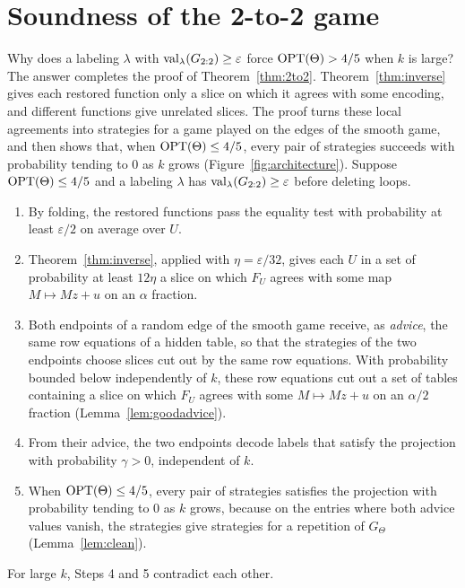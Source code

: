 \chapter{Soundness of the 2-to-2 game}\label{ch:twotwo}

Why does a labeling $\lambda$ with $\operatorname{val}_\lambda(G_{2:2})\ge\varepsilon$ force $\operatorname{OPT}(\Theta)>4/5$ when $k$ is large? The answer completes the proof of Theorem~\ref{thm:2to2}. Theorem~\ref{thm:inverse} gives each restored function only a slice on which it agrees with some encoding, and different functions give unrelated slices. The proof turns these local agreements into strategies for a game played on the edges of the smooth game, and then shows that, when $\operatorname{OPT}(\Theta)\le4/5$, every pair of strategies succeeds with probability tending to $0$ as $k$ grows (Figure~\ref{fig:architecture}). Suppose $\operatorname{OPT}(\Theta)\le4/5$ and a labeling $\lambda$ has $\operatorname{val}_\lambda(G_{2:2})\ge\varepsilon$ before deleting loops.
\begin{enumerate}
\item By folding, the restored functions pass the equality test with probability at least $\varepsilon/2$ on average over $U$.
\item Theorem~\ref{thm:inverse}, applied with $\eta=\varepsilon/32$, gives each $U$ in a set of probability at least $12\eta$ a slice on which $F_U$ agrees with some map $M\mapsto Mz+u$ on an $\alpha$ fraction.
\item Both endpoints of a random edge of the smooth game receive, as \emph{advice}, the same row equations of a hidden table, so that the strategies of the two endpoints choose slices cut out by the same row equations. With probability bounded below independently of $k$, these row equations cut out a set of tables containing a slice on which $F_U$ agrees with some $M\mapsto Mz+u$ on an $\alpha/2$ fraction (Lemma~\ref{lem:goodadvice}).
\item From their advice, the two endpoints decode labels that satisfy the projection with probability $\gamma>0$, independent of $k$.
\item When $\operatorname{OPT}(\Theta)\le4/5$, every pair of strategies satisfies the projection with probability tending to $0$ as $k$ grows, because on the entries where both advice values vanish, the strategies give strategies for a repetition of $G_\Theta$ (Lemma~\ref{lem:clean}).
\end{enumerate}
For large $k$, Steps 4 and 5 contradict each other.


